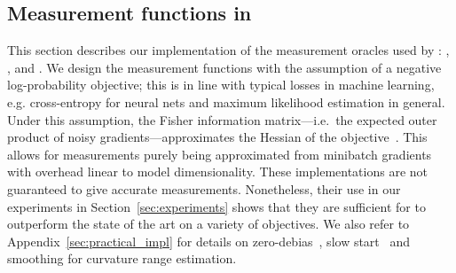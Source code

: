 \subsection{Measurement functions in \tuner}
\label{sec:oracles}
This section describes our implementation of the measurement oracles used by \tuner: , , and .
We design the measurement functions with the assumption of a negative log-probability objective; this is in line with typical losses in machine learning, e.g. cross-entropy for neural nets and maximum likelihood estimation in general.
Under this assumption, the Fisher information matrix---i.e.\ the expected outer product of noisy gradients---approximates the Hessian of the objective~\citep{johnfisherinfo2016,pascanu2013revisiting}. This allows for measurements purely being approximated from minibatch gradients with overhead linear to model dimensionality.
These implementations are not guaranteed to give accurate measurements.
Nonetheless, their use in our experiments in Section~\ref{sec:experiments} shows that they are sufficient for \tuner to outperform the state of the art on a variety of objectives. We also refer to Appendix~\ref{sec:practical_impl} for details on zero-debias~\citep{kingma2014adam}, slow start~\citep{schaul2013no} and smoothing for curvature range estimation.

